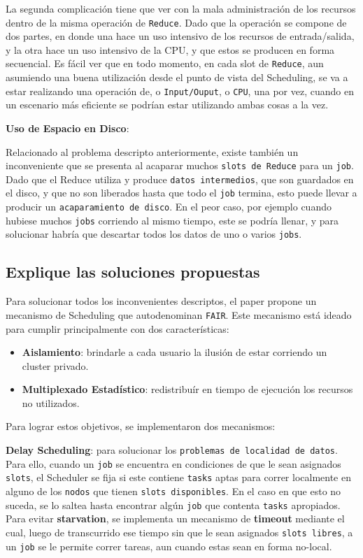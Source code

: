 \documentclass[11pt, a4paper, twoside]{article}
\begin{document}
La segunda complicación tiene que ver con la mala administración de los recursos
dentro de la misma operación de \texttt{Reduce}. Dado que la operación se
compone de dos partes, en donde una hace un uso intensivo de los recursos de
entrada/salida, y la otra hace un uso intensivo de la CPU, y que estos se
producen en forma secuencial. Es fácil ver que en todo momento, en cada slot de
\texttt{Reduce}, aun asumiendo una buena utilización desde el punto de vista del
Scheduling, se va a estar realizando una operación de, o \texttt{Input/Ouput}, o
\texttt{CPU}, una por vez, cuando en un escenario más eficiente se podrían estar
utilizando ambas cosas a la vez.

\textbf{Uso de Espacio en Disco}:

Relacionado al problema descripto anteriormente, existe también un inconveniente
que se presenta al acaparar muchos \texttt{slots de Reduce} para un
\texttt{job}. Dado que el Reduce utiliza y produce \texttt{datos intermedios},
que son guardados en el disco, y que no son liberados hasta que todo el
\texttt{job} termina, esto puede llevar a producir un \texttt{acaparamiento de
disco}. En el peor caso, por ejemplo cuando hubiese muchos \texttt{jobs}
corriendo al mismo tiempo, este se podría llenar, y para solucionar habría que
descartar todos los datos de uno o varios \texttt{jobs}.

\clearpage
\subsection {\footnotesize Explique las soluciones propuestas}
\label{investigacion-6}

Para solucionar todos los inconvenientes descriptos, el paper propone un
mecanismo de Scheduling que autodenominan \texttt{FAIR}. Este mecanismo está
ideado para cumplir principalmente con dos características:

\begin{itemize}
    \item \textbf{Aislamiento}: brindarle a cada usuario la ilusión de estar
    corriendo un cluster privado.
    \item \textbf{Multiplexado Estadístico}: redistribuír en tiempo de ejecución
    los recursos no utilizados.
\end{itemize}

Para lograr estos objetivos, se implementaron dos mecanismos:

\textbf{Delay Scheduling}: para solucionar los \texttt{problemas de localidad de
datos}. Para ello, cuando un \texttt{job} se encuentra en condiciones de que le
sean asignados \texttt{slots}, el Scheduler se fija si este contiene
\texttt{tasks} aptas para correr localmente en alguno de los \texttt{nodos} que
tienen \texttt{slots disponibles}. En el caso en que esto no suceda, se lo
saltea hasta encontrar algún \texttt{job} que contenta \texttt{tasks}
apropiados. Para evitar \textbf{starvation}, se implementa un mecanismo de
\textbf{timeout} mediante el cual, luego de transcurrido ese tiempo sin que le
sean asignados \texttt{slots libres}, a un \texttt{job} se le permite correr
tareas, aun cuando estas sean en forma no-local.
\end{document}
